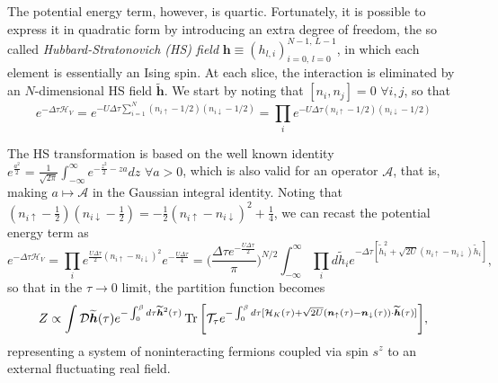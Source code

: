 The potential energy term, however, is quartic.
Fortunately, it is possible to express it in quadratic form by introducing an extra degree of freedom, the so called \emph{Hubbard-Stratonovich (HS) field} $\bm h \equiv (h_{l, i})_{i=0,\, l= 0}^{N-1, \, L - 1}$, in which each element is essentially an Ising spin.
At each slice, the interaction is eliminated by an $N$-dimensional HS field $\widetilde{\bm h}$.
We start by noting that $[ n_i , n_j ] = 0 \,\, \forall i, j$, so that
\begin{equation}\label{eq:Hint}
e^{-\Delta\tau \mathcal{H}_V} = e^{-U \Delta\tau \sum_{i=1}^N (n_{i\uparrow} - 1/2 ) (n_{i\downarrow} - 1/2 )} = \prod_i e^{-U \Delta\tau (n_{i\uparrow} - 1/2 ) (n_{i\downarrow} - 1/2 )}
\end{equation}

The HS transformation is based on the well known identity 
$
e^{ \frac{a^2}{2}} = \frac{1}{\sqrt{2\pi}} \int_{-\infty}^{\infty} e^{-\frac{z^2}{2}  - za } dz
$ 
$ \forall a > 0$, 
which is also valid for an operator $\mathcal{A}$, that is, making $a \mapsto \mathcal{A}$ in the Gaussian integral identity.
Noting that $(n_{i\uparrow} - \frac{1}{2} ) (n_{i\downarrow} - \frac{1}{2} ) = -\frac{1}{2} ( n_{i\uparrow} - n_{i\downarrow} )^2 + \frac{1}{4}$, we can recast the potential energy term as
\begin{equation}
e^{-\Delta\tau \mathcal{H}_V} = \prod_i e^{ \frac{U \Delta \tau}{2} ( n_{i\uparrow} - n_{i\downarrow} )^2 } e^{- \frac{U \Delta \tau}{4}}
=\bigg( \frac{\Delta \tau e^{- \frac{U \Delta \tau}{2}}}{\pi} \bigg)^{N/2} \int_{-\infty}^\infty \prod_i d \widetilde{h}_i e^{-\Delta \tau [ \widetilde{h}_i^2 + \sqrt{2U} ( n_{i\uparrow} - n_{i\downarrow} ) \widetilde{h}_i ]} ,
\end{equation}
so that in the $\tau \rightarrow 0$ limit, the partition function becomes
\begin{equation}
Z \propto \int \mathcal{D} \widetilde{\bm h} ( \tau) e^{-\int_0^\beta d\tau \widetilde{\bm h}^2 ( \tau ) } \operatorname{Tr} \bigg[ \mathcal{T}_\tau e^{ -\int_0^\beta d\tau [ \mathcal{H}_K ( \tau ) + \sqrt{2U} ( \bm n_{\uparrow} (\tau) - \bm n_{\downarrow} (\tau ) ) \cdot \widetilde{\bm h}(\tau) ] } \bigg] ,
\end{equation}
representing a system of noninteracting fermions coupled via spin $s^z$ to an external fluctuating real field.

